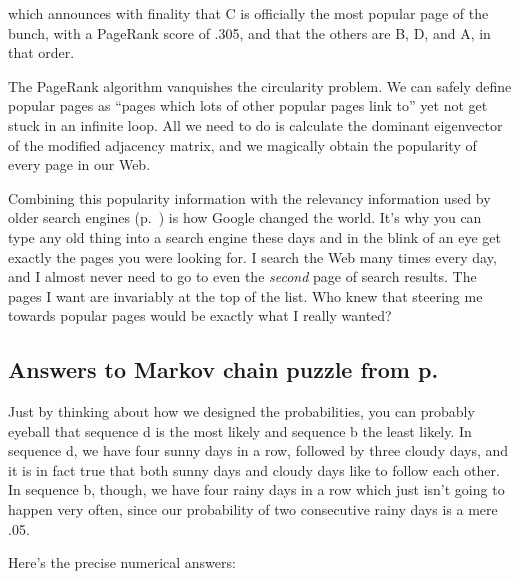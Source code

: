 \begin{alttitles}
which announces with finality that C is officially the most popular page of the
bunch, with a PageRank score of .305, and that the others are B, D, and A, in
that order.

The PageRank algorithm vanquishes the circularity problem. We can safely define
popular pages as ``pages which lots of other popular pages link to'' yet not
get stuck in an infinite loop. All we need to do is calculate the dominant
eigenvector of the modified adjacency matrix, and we magically obtain the
popularity of every page in our Web.

Combining this popularity information with the relevancy information used by
older search engines (p.~\pageref{sec:webSearchPreGoogle}) is how Google
changed the world. It's why you can type any old thing into a search engine
these days and in the blink of an eye get exactly the pages you were looking
for. I search the Web many times every day, and I almost never need to go to
even the \textit{second} page of search results. The pages I want are
invariably at the top of the list. Who knew that steering me towards popular
pages would be exactly what I really wanted?

\vfill
\pagebreak

\subsection*{Answers to Markov chain puzzle from
p.~\pageref{markovPuzzle}}

Just by thinking about how we designed the probabilities, you can probably
eyeball that sequence d is the most likely and sequence b the least likely. In
sequence d, we have four sunny days in a row, followed by three cloudy days,
and it is in fact true that both sunny days and cloudy days like to follow each
other. In sequence b, though, we have four rainy days in a row which just
isn't going to happen very often, since our probability of two consecutive
rainy days is a mere .05.

Here's the precise numerical answers:


\end{alttitles}
